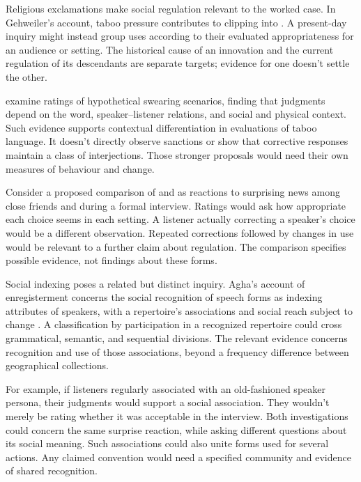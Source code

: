 \documentclass[12pt]{article}
\begin{document}
Religious exclamations make social regulation relevant to the worked
case. In Gehweiler's account, taboo pressure contributes to clipping
 into . A present-day inquiry might instead
group uses according to their evaluated appropriateness for an audience
or setting. The historical cause of an innovation and the current
regulation of its descendants are separate targets; evidence for one
doesn't settle the other.

\textcite{jayjanschewitz2008} examine ratings of hypothetical swearing scenarios,
finding that judgments depend on the word, speaker--listener relations,
and social and physical context. Such evidence
supports contextual differentiation in evaluations of taboo language.
It doesn't directly observe sanctions or show that corrective responses
maintain a class of interjections. Those stronger proposals would need
their own measures of behaviour and change.

Consider a proposed comparison of  and 
as reactions to surprising news among close friends and during a
formal interview. Ratings would ask how appropriate each choice seems
in each setting. A listener actually correcting a speaker's choice
would be a different observation. Repeated corrections followed by
changes in use would be relevant to a further claim about regulation.
The comparison specifies possible evidence, not findings about these forms.

Social indexing poses a related but distinct inquiry. Agha's account
of enregisterment concerns the social recognition of speech forms as
indexing attributes of speakers, with a repertoire's associations and
social reach subject to change \citep[38--40]{agha2005}. A classification
by participation in a recognized repertoire could cross grammatical,
semantic, and sequential divisions. The relevant evidence concerns
recognition and use of those associations, beyond a frequency difference
between geographical collections.

For example, if listeners regularly associated  with an
old-fashioned speaker persona, their judgments would support a social
association. They wouldn't merely be rating whether it was acceptable
in the interview. Both investigations could concern the same surprise
reaction, while asking different questions about its social meaning.
Such associations could also unite forms used for several actions.
Any claimed convention would need a specified community and evidence
of shared recognition.
\end{document}
